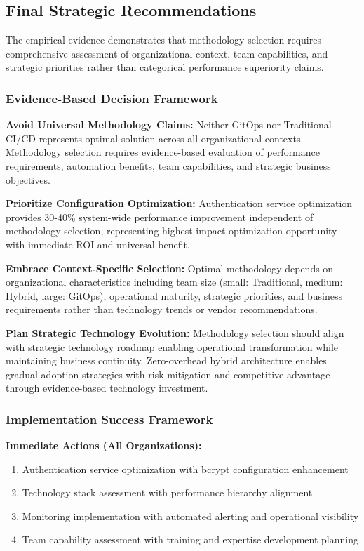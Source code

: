 \subsection{Final Strategic Recommendations}
\label{subsec:final_recommendations}

The empirical evidence demonstrates that methodology selection requires comprehensive assessment of organizational context, team capabilities, and strategic priorities rather than categorical performance superiority claims.

\subsubsection{Evidence-Based Decision Framework}

\textbf{Avoid Universal Methodology Claims:}
Neither GitOps nor Traditional CI/CD represents optimal solution across all organizational contexts. Methodology selection requires evidence-based evaluation of performance requirements, automation benefits, team capabilities, and strategic business objectives.

\textbf{Prioritize Configuration Optimization:}
Authentication service optimization provides 30-40\% system-wide performance improvement independent of methodology selection, representing highest-impact optimization opportunity with immediate ROI and universal benefit.

\textbf{Embrace Context-Specific Selection:}
Optimal methodology depends on organizational characteristics including team size (small: Traditional, medium: Hybrid, large: GitOps), operational maturity, strategic priorities, and business requirements rather than technology trends or vendor recommendations.

\textbf{Plan Strategic Technology Evolution:}
Methodology selection should align with strategic technology roadmap enabling operational transformation while maintaining business continuity. Zero-overhead hybrid architecture enables gradual adoption strategies with risk mitigation and competitive advantage through evidence-based technology investment.

\subsubsection{Implementation Success Framework}

\textbf{Immediate Actions (All Organizations):}
\begin{enumerate}
\item Authentication service optimization with bcrypt configuration enhancement
\item Technology stack assessment with performance hierarchy alignment
\item Monitoring implementation with automated alerting and operational visibility
\item Team capability assessment with training and expertise development planning
\end{enumerate}

